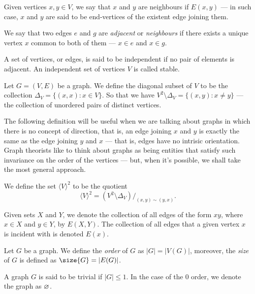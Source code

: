 \begin{definition}[Adjacency]
Given vertices \(x, y \in V\), we say that \(x\) and \(y\) are neighbours if
\(E(x, y)\) --- in such case, \(x\) and \(y\) are said to be end-vertices of the
existent edge joining them.

We say that two edges \(e\) and \(g\) are \emph{adjacent} or \emph{neighbours}
if there exists a unique vertex \(x\) common to both of them --- \(x \in e\)
and \(x \in g\).

A set of vertices, or edges, is said to be independent if no pair of elements
is adjacent. An independent set of vertices \(V\) is called stable.
\end{definition}

\begin{definition}
Let \(G = (V, E)\) be a graph. We define the diagonal subset of \(V\) to be
the collection \(\Delta_V = \{(x, x) : x \in V\}\). So that we have
\(V^2 \setminus \Delta_V = \{(x, y) : x \neq y\}\) --- the collection of
unordered pairs of distinct vertices.
\end{definition}

The following definition will be useful when we are talking about graphs in
which there is no concept of direction, that is, an edge joining \(x\) and \(y\)
is exactly the same as the edge joining \(y\) and \(x\) --- that is, edges have no
intrisic orientation. Graph theorists like to think about graphs as being
entities that satisfy such invariance on the order of the vertices --- but, when
it's possible, we shall take the most general approach.

\begin{definition}
We define the set \(\langle V \rangle^2\) to be the quotient
\[
  \langle V \rangle^2 = (V^2 \setminus \Delta_V)/_{(x, y) \sim (y, x)}.
\]
\end{definition}

\begin{notation}
Given sets \(X\) and \(Y\), we denote the collection of all edges of the form
\(xy\), where \(x \in X\) and \(y \in Y\), by \(E(X, Y)\). The collection of
all edges that a given vertex \(x\) is incident with is denoted \(E(x)\).
\end{notation}

\begin{definition}\label{def:graph-order-size}
Let \(G\) be a graph. We define the \emph{order} of \(G\) as \(|G| =|V(G)|\),
moreover, the \emph{size} of \(G\) is defined as \(\size{G} = |E(G)|\).
\end{definition}

\begin{definition}
A graph \(G\) is said to be trivial if \(|G| \leq 1\). In the case of the
\(0\) order, we denote the graph as \(\varnothing\).
\end{definition}
